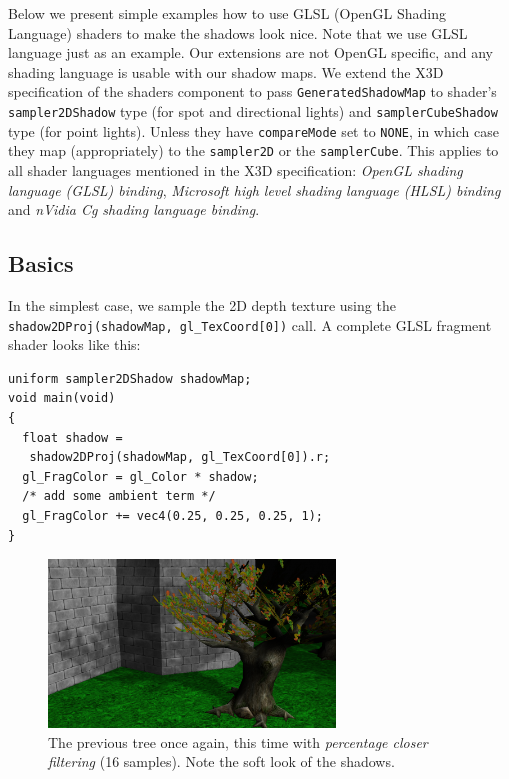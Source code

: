 \documentclass{acmsiggraph}                     %
\newenvironment{mycode}
{\begin{mycodecore}}
{\end{mycodecore}
\vspace{-0.1in}}
\begin{document}
Below we present simple examples how to use GLSL (OpenGL Shading Language)
shaders to make the shadows look nice.
Note that we use GLSL language just as an example. Our extensions
are not OpenGL specific, and any shading language is usable with our shadow maps.
We extend the X3D specification of the shaders component to pass
\texttt{GeneratedShadowMap} to shader's
\texttt{sampler2DShadow} type (for spot and directional
lights) and \texttt{samplerCubeShadow} type (for point lights).
Unless they have \texttt{compareMode} set to \texttt{NONE},
in which case they map (appropriately) to the \texttt{sampler2D} or the \texttt{samplerCube}.
This applies to all shader languages mentioned in the X3D specification:
\emph{OpenGL shading language (GLSL) binding},
\emph{Microsoft high level shading language (HLSL) binding} and
\emph{nVidia Cg shading language binding}.

\subsection{Basics}

In the simplest case, we sample the 2D depth texture using
the \texttt{shadow2DProj(shadowMap, gl\_TexCoord[0])} call.
A complete GLSL fragment shader looks like this:


\begin{mycode}
\begin{Verbatim}
uniform sampler2DShadow shadowMap;
void main(void)
{
  float shadow =
   shadow2DProj(shadowMap, gl_TexCoord[0]).r;
  gl_FragColor = gl_Color * shadow;
  /* add some ambient term */
  gl_FragColor += vec4(0.25, 0.25, 0.25, 1);
}
\end{Verbatim}
\end{mycode}

\begin{figure}[H]
  \centering
  \includegraphics[width=3.0in]{sunny_street_tree_pcf16}
  \caption{The previous tree once again, this time with \textit{percentage closer filtering} (16 samples). Note the soft look of the shadows.}
\end{figure}
\end{document}
